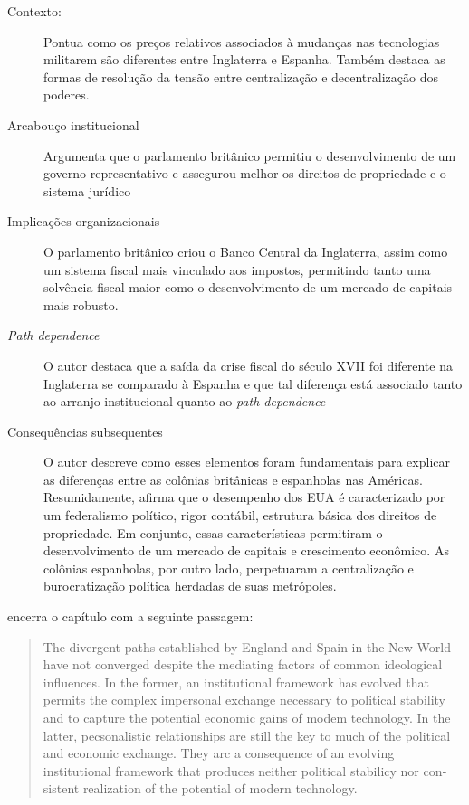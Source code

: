\begin{description}
	\item[Contexto:] Pontua como os preços relativos associados à mudanças nas tecnologias militarem são diferentes entre Inglaterra e Espanha. Também destaca as formas de resolução da tensão entre centralização e decentralização dos poderes.
	\item[Arcabouço institucional] Argumenta que o parlamento britânico permitiu o desenvolvimento de um governo representativo e assegurou melhor os direitos de propriedade e o sistema jurídico
	\item[Implicações organizacionais] O parlamento britânico criou o Banco Central da Inglaterra, assim como um sistema fiscal mais vinculado aos impostos, permitindo tanto uma solvência fiscal maior como o desenvolvimento de um mercado de capitais mais robusto.
	\item[\textit{Path dependence}] O autor destaca que a saída da crise fiscal do século XVII foi diferente na Inglaterra se comparado à Espanha e que tal diferença está associado tanto ao arranjo institucional quanto ao \textit{path-dependence}
	\item[Consequências subsequentes] O autor descreve como esses elementos foram fundamentais para explicar as diferenças entre as colônias britânicas e espanholas nas Américas. Resumidamente, afirma que o desempenho dos EUA é caracterizado por um federalismo político, rigor contábil, estrutura básica dos direitos de propriedade. Em conjunto, essas características permitiram o desenvolvimento de um mercado de capitais e crescimento econômico. As colônias espanholas, por outro lado, perpetuaram a centralização e burocratização política herdadas de suas metrópoles.
\end{description}

\autor encerra o capítulo com a seguinte passagem:

\begin{quotation}
	The divergent paths established by England and Spain in the New
	World have not converged despite the mediating factors of common ideological influences. In the former, an institutional framework has evolved
	that permits the complex impersonal exchange necessary to political sta­bility and to capture the potential economic gains of modem technology.
	In the latter, pecsonalistic relationships are still the key to much of the
	political and economic exchange. They arc a consequence of an evolving 	institutional framework that produces neither political stabilicy nor con­sistent realization of the potential of modern technology.
\end{quotation}
